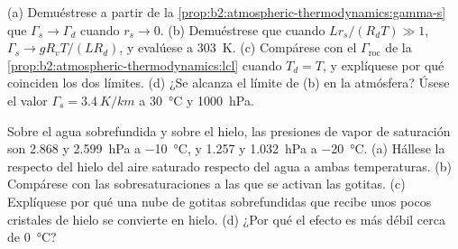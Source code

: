 \begin{exercise}[$\star\star\star$]\label{exo:b2:atmospheric-thermodynamics:11}
(a) Demuéstrese a partir de la \cref{prop:b2:atmospheric-thermodynamics:gamma-s} que $\Gamma_s \to \Gamma_d$
cuando $r_s \to 0$. (b) Demuéstrese que cuando $Lr_s/(R_dT) \gg 1$, $\Gamma_s \to gR_vT/(LR_d)$, y
evalúese a \qty{303}{K}. (c) Compárese con el $\Gamma_{\text{roc}}$ de la
\cref{prop:b2:atmospheric-thermodynamics:lcl} cuando $T_d = T$, y explíquese por qué coinciden los dos
límites. (d) ¿Se alcanza el límite de (b) en la atmósfera? Úsese el valor $\Gamma_s =
\qty{3.4}{K/km}$ a \qty{30}{\celsius} y \qty{1000}{hPa}.
\end{exercise}

\begin{exercise}[$\star\star\star$]\label{exo:b2:atmospheric-thermodynamics:12}
Sobre el agua sobrefundida y sobre el hielo, las presiones de vapor de saturación son 2.868 y
\qty{2.599}{hPa} a \qty{-10}{\celsius}, y 1.257 y \qty{1.032}{hPa} a \qty{-20}{\celsius}.
(a) Hállese la  respecto del hielo del aire saturado respecto del agua a ambas temperaturas. (b)
Compárese con las sobresaturaciones a las que se activan las gotitas. (c) Explíquese por qué una nube de
gotitas sobrefundidas que recibe unos pocos cristales de hielo se convierte en hielo. (d) ¿Por qué el efecto es
más débil cerca de \qty{0}{\celsius}?
\end{exercise}

